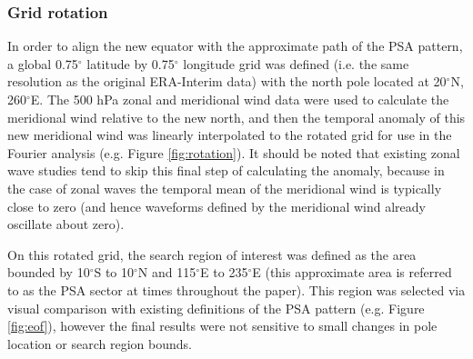 \subsubsection{Grid rotation}

In order to align the new equator with the approximate path of the PSA pattern, a global 0.75$^{\circ}$ latitude by 0.75$^{\circ}$ longitude grid was defined (i.e. the same resolution as the original ERA-Interim data) with the north pole located at 20$^{\circ}$N, 260$^{\circ}$E. The 500 hPa zonal and meridional wind data were used to calculate the meridional wind relative to the new north, and then the temporal anomaly of this new meridional wind was linearly interpolated to the rotated grid for use in the Fourier analysis (e.g. Figure \ref{fig:rotation}). It should be noted that existing zonal wave studies \citep[e.g.][]{IrvingSimmonds2015} tend to skip this final step of calculating the anomaly, because in the case of zonal waves the temporal mean of the meridional wind is typically close to zero (and hence waveforms defined by the meridional wind already oscillate about zero). 

On this rotated grid, the search region of interest was defined as the area bounded by 10$^{\circ}$S to 10$^{\circ}$N and 115$^{\circ}$E to 235$^{\circ}$E (this approximate area is referred to as the PSA sector at times throughout the paper). This region was selected via visual comparison with existing definitions of the PSA pattern (e.g. Figure \ref{fig:eof}), however the final results were not sensitive to small changes in pole location or search region bounds.

